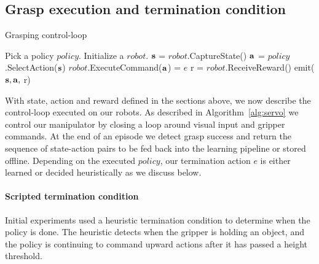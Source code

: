 \documentclass{article}
\begin{document}
\subsection{Grasp execution and termination condition}\label{appendix:termination}\begin{algorithm}[h]{\small
	\caption{Grasping control-loop}

	\label{alg:servo}
	\begin{algorithmic}[1]
	\STATE Pick a policy \(policy\).
	\STATE Initialize a \(robot\).
    \STATE $\mathbf{s}$ = \(robot\).CaptureState()
    \STATE $\mathbf{a}$ = \(policy\).SelectAction($\mathbf{s}$)
    \STATE \(robot\).ExecuteCommand($\mathbf{a}$)
     = $e$ 
    \STATE r = \(robot\).ReceiveReward()
    \STATE emit($\mathbf{s}, \mathbf{a},$ r)
   \ENDWHILE
 	\end{algorithmic}
}
\end{algorithm}
With state, action and reward defined in the sections above, we now describe the control-loop executed on our robots. As described in Algorithm~\ref{alg:servo} we control our manipulator by closing a loop around visual input and gripper commands. At the end of an episode we detect grasp success and return the sequence of state-action pairs to be fed back into the learning pipeline or stored offline. Depending on the executed \(policy\), our termination action $e$ is either learned or decided heuristically as we discuss below.
\paragraph{Scripted termination condition} Initial experiments used a heuristic termination condition to determine when the policy is done. The heuristic detects when the gripper is holding an object, and the policy is continuing to command upward actions after it has passed a height threshold.
\end{document}
